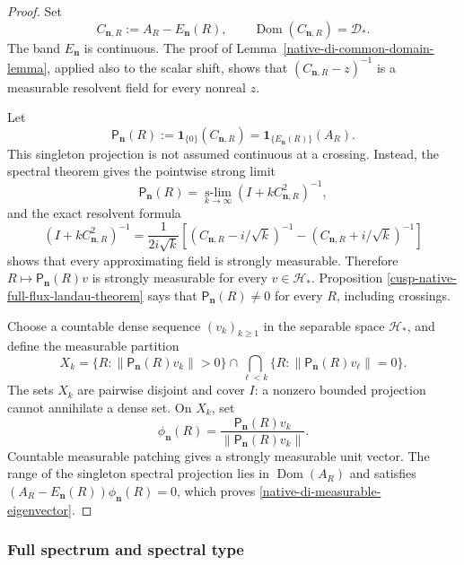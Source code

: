 \begin{proof}
Set
\[
 C_{\mathbf n,R}:=A_R-E_{\mathbf n}(R),
 \qquad \operatorname{Dom}(C_{\mathbf n,R})=\mathscr D_*.
\]
The band \(E_{\mathbf n}\) is continuous.  The proof of
Lemma~\ref{native-di-common-domain-lemma}, applied also to the scalar
shift, shows that
\((C_{\mathbf n,R}-z)^{-1}\) is a measurable resolvent field for every
nonreal \(z\).

Let
\[
 \mathsf P_{\mathbf n}(R)
 :=\mathbf 1_{\{0\}}(C_{\mathbf n,R})
 =\mathbf 1_{\{E_{\mathbf n}(R)\}}(A_R).
\]
This singleton projection is not assumed continuous at a crossing.
Instead, the spectral theorem gives the pointwise strong limit
\begin{equation}
 \mathsf P_{\mathbf n}(R)
 =\operatorname*{s-lim}_{k\to\infty}
  (I+kC_{\mathbf n,R}^2)^{-1},
\label{native-di-kernel-projection}
\end{equation}
and the exact resolvent formula
\begin{equation}
 (I+kC_{\mathbf n,R}^2)^{-1}
 =\frac1{2i\sqrt{k}}
 \left[
 (C_{\mathbf n,R}-i/\sqrt{k})^{-1}
 -(C_{\mathbf n,R}+i/\sqrt{k})^{-1}
 \right]
\label{native-di-kernel-projection-resolvent}
\end{equation}
shows that every approximating field is strongly measurable.  Therefore
\(R\mapsto\mathsf P_{\mathbf n}(R)v\) is strongly measurable for every
\(v\in\mathscr H_*\).  Proposition
\ref{cusp-native-full-flux-landau-theorem} says that
\(\mathsf P_{\mathbf n}(R)\ne0\) for every \(R\), including crossings.

Choose a countable dense sequence \((v_k)_{k\ge1}\) in the separable
space \(\mathscr H_*\), and define the measurable partition
\[
 X_k=
 \{R:\|\mathsf P_{\mathbf n}(R)v_k\|>0\}
 \cap
 \bigcap_{\ell<k}
 \{R:\|\mathsf P_{\mathbf n}(R)v_\ell\|=0\}.
\]
The sets \(X_k\) are pairwise disjoint and cover \(I\): a nonzero bounded
projection cannot annihilate a dense set.  On \(X_k\), set
\[
 \phi_{\mathbf n}(R)
 =\frac{\mathsf P_{\mathbf n}(R)v_k}
 {\|\mathsf P_{\mathbf n}(R)v_k\|}.
\]
Countable measurable patching gives a strongly measurable unit vector.
The range of the singleton spectral projection lies in
\(\operatorname{Dom}(A_R)\) and satisfies
\((A_R-E_{\mathbf n}(R))\phi_{\mathbf n}(R)=0\), which proves
\eqref{native-di-measurable-eigenvector}.
\end{proof}

\subsubsection{Full spectrum and spectral type}


